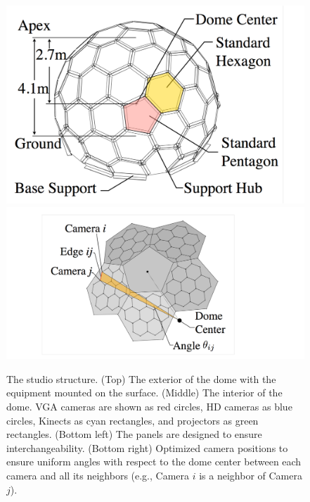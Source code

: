	\begin{figure}
		\centering       
		\includegraphics[trim=0 0 100 0,clip,width=0.48\linewidth]{figures/DomeFigure2} 
		\includegraphics[trim=230 50 400 50,clip,width=0.48\linewidth]{figures/DomeFigure3}
		\caption{The studio structure. (Top) The exterior of the dome with the equipment mounted on the surface. (Middle) The interior of the dome. VGA cameras are shown as red circles, HD cameras as blue circles, Kinects as cyan rectangles, and projectors as green rectangles. (Bottom left) The panels are designed to ensure interchangeability. (Bottom right) Optimized camera positions to ensure uniform angles with respect to the dome center between each camera and all its neighbors (e.g., Camera $i$ is a neighbor of Camera $j$).} 
		\label{fig:domeFigure}
	\end{figure}
	
